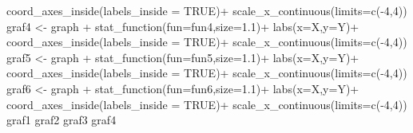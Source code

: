 \documentclass[
  letterpaper,
  DIV=11,
  numbers=noendperiod]{scrartcl}
\newenvironment{Shaded}{\begin{snugshade}}{\end{snugshade}}
\newcommand{\AttributeTok}[1]{\textcolor[rgb]{0.40,0.45,0.13}{#1}}
\newcommand{\ConstantTok}[1]{\textcolor[rgb]{0.56,0.35,0.01}{#1}}
\newcommand{\DecValTok}[1]{\textcolor[rgb]{0.68,0.00,0.00}{#1}}
\newcommand{\FloatTok}[1]{\textcolor[rgb]{0.68,0.00,0.00}{#1}}
\newcommand{\FunctionTok}[1]{\textcolor[rgb]{0.28,0.35,0.67}{#1}}
\newcommand{\NormalTok}[1]{\textcolor[rgb]{0.00,0.23,0.31}{#1}}
\newcommand{\OtherTok}[1]{\textcolor[rgb]{0.00,0.23,0.31}{#1}}
\newcommand{\SpecialCharTok}[1]{\textcolor[rgb]{0.37,0.37,0.37}{#1}}
\newcommand{\StringTok}[1]{\textcolor[rgb]{0.13,0.47,0.30}{#1}}
\begin{document}
\begin{Shaded}
\begin{Highlighting}[]
  \FunctionTok{coord\_axes\_inside}\NormalTok{(}\AttributeTok{labels\_inside =} \ConstantTok{TRUE}\NormalTok{)}\SpecialCharTok{+}
  \FunctionTok{scale\_x\_continuous}\NormalTok{(}\AttributeTok{limits=}\FunctionTok{c}\NormalTok{(}\SpecialCharTok{{-}}\DecValTok{4}\NormalTok{,}\DecValTok{4}\NormalTok{))}
\NormalTok{graf4 }\OtherTok{\textless{}{-}}\NormalTok{ graph }\SpecialCharTok{+}
  \FunctionTok{stat\_function}\NormalTok{(}\AttributeTok{fun=}\NormalTok{fun4,}\AttributeTok{size=}\FloatTok{1.1}\NormalTok{)}\SpecialCharTok{+}
  \FunctionTok{labs}\NormalTok{(}\AttributeTok{x=}\StringTok{\textquotesingle{}X\textquotesingle{}}\NormalTok{,}\AttributeTok{y=}\StringTok{\textquotesingle{}Y\textquotesingle{}}\NormalTok{)}\SpecialCharTok{+}
  \FunctionTok{coord\_axes\_inside}\NormalTok{(}\AttributeTok{labels\_inside =} \ConstantTok{TRUE}\NormalTok{)}\SpecialCharTok{+}
  \FunctionTok{scale\_x\_continuous}\NormalTok{(}\AttributeTok{limits=}\FunctionTok{c}\NormalTok{(}\SpecialCharTok{{-}}\DecValTok{4}\NormalTok{,}\DecValTok{4}\NormalTok{))}
\NormalTok{graf5 }\OtherTok{\textless{}{-}}\NormalTok{ graph }\SpecialCharTok{+}
  \FunctionTok{stat\_function}\NormalTok{(}\AttributeTok{fun=}\NormalTok{fun5,}\AttributeTok{size=}\FloatTok{1.1}\NormalTok{)}\SpecialCharTok{+}
  \FunctionTok{labs}\NormalTok{(}\AttributeTok{x=}\StringTok{\textquotesingle{}X\textquotesingle{}}\NormalTok{,}\AttributeTok{y=}\StringTok{\textquotesingle{}Y\textquotesingle{}}\NormalTok{)}\SpecialCharTok{+}
  \FunctionTok{coord\_axes\_inside}\NormalTok{(}\AttributeTok{labels\_inside =} \ConstantTok{TRUE}\NormalTok{)}\SpecialCharTok{+}
  \FunctionTok{scale\_x\_continuous}\NormalTok{(}\AttributeTok{limits=}\FunctionTok{c}\NormalTok{(}\SpecialCharTok{{-}}\DecValTok{4}\NormalTok{,}\DecValTok{4}\NormalTok{))}
\NormalTok{graf6 }\OtherTok{\textless{}{-}}\NormalTok{ graph }\SpecialCharTok{+}
  \FunctionTok{stat\_function}\NormalTok{(}\AttributeTok{fun=}\NormalTok{fun6,}\AttributeTok{size=}\FloatTok{1.1}\NormalTok{)}\SpecialCharTok{+}
  \FunctionTok{labs}\NormalTok{(}\AttributeTok{x=}\StringTok{\textquotesingle{}X\textquotesingle{}}\NormalTok{,}\AttributeTok{y=}\StringTok{\textquotesingle{}Y\textquotesingle{}}\NormalTok{)}\SpecialCharTok{+}
  \FunctionTok{coord\_axes\_inside}\NormalTok{(}\AttributeTok{labels\_inside =} \ConstantTok{TRUE}\NormalTok{)}\SpecialCharTok{+}
  \FunctionTok{scale\_x\_continuous}\NormalTok{(}\AttributeTok{limits=}\FunctionTok{c}\NormalTok{(}\SpecialCharTok{{-}}\DecValTok{4}\NormalTok{,}\DecValTok{4}\NormalTok{))}
\NormalTok{graf1}
\NormalTok{graf2}
\NormalTok{graf3}
\NormalTok{graf4}
\end{Highlighting}
\end{Shaded}
\end{document}
